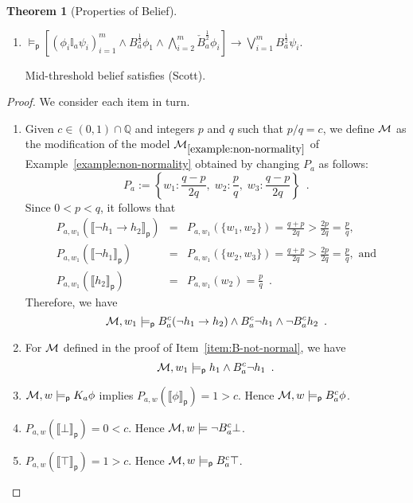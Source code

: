 \documentclass[12pt]{article}
\theoremstyle{definition}
\newtheorem{theorem}{Theorem}[section]
\newcommand{\Rat}{\mathbb{Q}}  %
\newcommand{\M}{{\cal M}}      %
\newcommand{\modelsp}{\models_{\mathsf{p}}}                  %
\newcommand{\semp}[1]{\llbracket{#1}\rrbracket_{\mathsf{p}}} %
\begin{document}
\begin{theorem}[Properties of Belief]
\begin{enumerate}
    For mid-threshold belief, if $\phi$ is consistent
    with agent $a$'s beliefs and $\lnot\phi\land\psi$ is
    consistent with agent $a$'s knowledge, then agent $a$ believes
    $\phi\lor\psi$.  

  \item \label{item:B-Len}
    $
    \textstyle \modelsp
    [(\phi_i\mathbb{I}_a\psi_i)_{i=1}^m \land
    B_a^{\frac 12}\phi_1 \land \bigwedge_{i=2}^m \check B_a^{\frac 12}\phi_i] \to
    \bigvee_{i=1}^m B_a^{\frac 12}\psi_i
    $.

    Mid-threshold belief satisfies (Scott).
  \end{enumerate}
\end{theorem}
\begin{proof}
  We consider each item in turn.
  \begin{enumerate}
  \item Given $c\in(0,1)\cap\Rat$ and integers $p$ and $q$ such that
    $p/q=c$, we define $\M$ as the modification of the model
    $\M_{\ref{example:non-normality}}$ of
    Example~\ref{example:non-normality} obtained by changing
    $P_a$ as follows:
    \[
    P_a := \left\{ w_1:\frac{q-p}{2q},\; w_2:\frac pq,\; w_3:\frac{q-p}{2q}
    \right\}\enspace.
    \]
    Since $0<p<q$, it follows that
    \begin{eqnarray*}
      P_{a,w_1}(\semp{\lnot h_1\to h_2}) &=&
      P_{a,w_1}(\{w_1,w_2\}) =
      \frac{q+p}{2q}>\frac {2p}{2q}=\frac pq,
      \\
      P_{a,w_1}(\semp{\lnot h_1}) &=&
      P_{a,w_1}(\{w_2,w_3\}) = \frac{q+p}{2q}>\frac {2p}{2q}=\frac pq,\text{ and}
      \\
      P_{a,w_1}(\semp{h_2})&=& 
      P_{a,w_1}(w_2) = \frac pq\enspace.
    \end{eqnarray*}
    Therefore, we have
    \[
    \M,w_1\modelsp B^c_a(\lnot h_1\to h_2)\land B^c_a\lnot h_1\land
    \lnot B^c_ah_2\enspace.
    \]
    
  \item For $\M$ defined in the proof of Item~\ref{item:B-not-normal},
    we have
    \[
    \M,w_1\modelsp h_1\land B_a^c\lnot h_1\enspace.
    \]
    
  \item $\M,w\modelsp K_a\phi$ implies $P_{a,w}(\semp{\phi})=1 > c$.
    Hence $\M,w\modelsp B_a^c\phi$.

  \item $P_{a,w}(\semp{\bot})=0<c$.  Hence
    $\M,w\models\lnot B^c_a\bot$.

  \item $P_{a,w}(\semp{\top})=1>c$. Hence
    $\M,w\modelsp B_a^c\top$.


\end{enumerate}
\end{proof}
\end{document}
